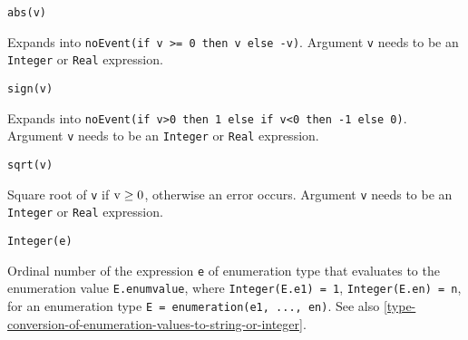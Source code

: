\begin{operatordefinition*}[abs]
\begin{synopsis}\begin{lstlisting}
abs(v)
\end{lstlisting}\end{synopsis}
\begin{semantics}
Expands into \lstinline!noEvent(if v >= 0 then v else -v)!.  Argument \lstinline!v! needs to be an \lstinline!Integer! or \lstinline!Real! expression.
\end{semantics}
\end{operatordefinition*}

\begin{operatordefinition*}[sign]
\begin{synopsis}\begin{lstlisting}
sign(v)
\end{lstlisting}\end{synopsis}
\begin{semantics}
Expands into \lstinline!noEvent(if v>0 then 1 else if v<0 then -1 else 0)!.  Argument \lstinline!v! needs to be an \lstinline!Integer! or \lstinline!Real! expression.
\end{semantics}
\end{operatordefinition*}

\begin{operatordefinition*}[sqrt]
\begin{synopsis}\begin{lstlisting}
sqrt(v)
\end{lstlisting}\end{synopsis}
\begin{semantics}
Square root of \lstinline!v! if $\text{\lstinline!v!} \geq 0$, otherwise an error occurs.  Argument \lstinline!v! needs to be an \lstinline!Integer! or \lstinline!Real! expression.
\end{semantics}
\end{operatordefinition*}

\begin{operatordefinition*}[Integer]
\begin{synopsis}\begin{lstlisting}
Integer(e)
\end{lstlisting}\end{synopsis}
\begin{semantics}
Ordinal number of the expression \lstinline!e! of enumeration type that evaluates to the enumeration value \lstinline!E.enumvalue!, where \lstinline!Integer(E.e1) = 1!, \lstinline!Integer(E.en) = n!,
for an enumeration type \lstinline!E = enumeration(e1, ..., en)!.  See also \cref{type-conversion-of-enumeration-values-to-string-or-integer}.
\end{semantics}
\end{operatordefinition*}

